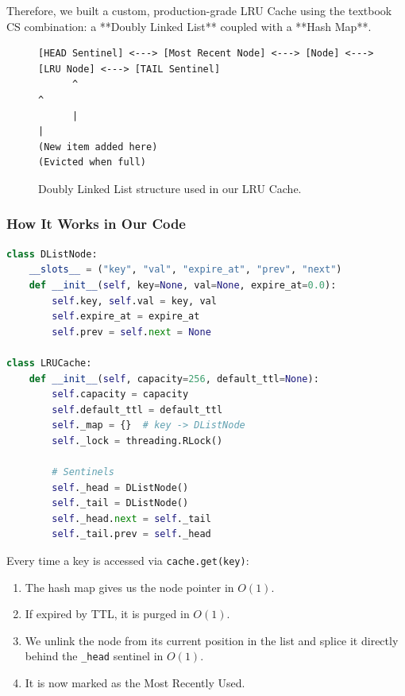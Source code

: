 \documentclass[11pt,a4paper]{article}
\begin{document}
Therefore, we built a custom, production-grade LRU Cache using the textbook CS combination: a **Doubly Linked List** coupled with a **Hash Map**.

\begin{figure}[h!]
\centering
\begin{verbatim}
[HEAD Sentinel] <---> [Most Recent Node] <---> [Node] <---> [LRU Node] <---> [TAIL Sentinel]
      ^                                                            ^
      |                                                            |
(New item added here)                                    (Evicted when full)
\end{verbatim}
\caption{Doubly Linked List structure used in our LRU Cache.}
\end{figure}

\subsubsection{How It Works in Our Code}
\begin{lstlisting}[language=Python]
class DListNode:
    __slots__ = ("key", "val", "expire_at", "prev", "next")
    def __init__(self, key=None, val=None, expire_at=0.0):
        self.key, self.val = key, val
        self.expire_at = expire_at
        self.prev = self.next = None

class LRUCache:
    def __init__(self, capacity=256, default_ttl=None):
        self.capacity = capacity
        self.default_ttl = default_ttl
        self._map = {}  # key -> DListNode
        self._lock = threading.RLock()
        
        # Sentinels
        self._head = DListNode()
        self._tail = DListNode()
        self._head.next = self._tail
        self._tail.prev = self._head
\end{lstlisting}

Every time a key is accessed via \texttt{cache.get(key)}:
\begin{enumerate}
    \item The hash map gives us the node pointer in $O(1)$.
    \item If expired by TTL, it is purged in $O(1)$.
    \item We unlink the node from its current position in the list and splice it directly behind the \texttt{\_head} sentinel in $O(1)$.
    \item It is now marked as the Most Recently Used.
\end{enumerate}
\end{document}
